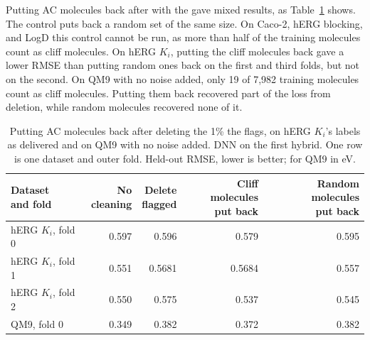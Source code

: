 Putting AC molecules back after  with the  gave mixed results, as Table~\ref{tab:noise:res:cliff_putback} shows. The control puts back a random set of the same size. On Caco-2, hERG blocking, and LogD this control cannot be run, as more than half of the training molecules count as cliff molecules. On hERG $K_i$, putting the cliff molecules back gave a lower RMSE than putting random ones back on the first and third folds, but not on the second. On QM9 with no noise added, only 19 of 7,982 training molecules count as cliff molecules. Putting them back recovered part of the loss from deletion, while random molecules recovered none of it.

\begin{table}[htbp]
\centering
\begin{tabular}{@{}lrrrr@{}}
\toprule
\makecell[l]{Dataset\\and fold} & \makecell[r]{No\\cleaning} & \makecell[r]{Delete\\flagged} & \makecell[r]{Cliff molecules\\put back} & \makecell[r]{Random molecules\\put back} \\
\midrule
hERG $K_i$, fold 0 & 0.597 & 0.596 & 0.579 & 0.595 \\
hERG $K_i$, fold 1 & 0.551 & 0.5681 & 0.5684 & 0.557 \\
hERG $K_i$, fold 2 & 0.550 & 0.575 & 0.537 & 0.545 \\
\midrule
QM9, fold 0 & 0.349 & 0.382 & 0.372 & 0.382 \\
\bottomrule
\end{tabular}
\caption[Putting cliff molecules back on hERG $K_i$ and QM9.]{Putting AC molecules back after deleting the 1\% the  flags, on hERG $K_i$'s labels as delivered and on QM9 with no noise added. DNN on the first hybrid. One row is one dataset and outer fold. Held-out RMSE, lower is better; for QM9 in eV.}
\label{tab:noise:res:cliff_putback}
\end{table}

